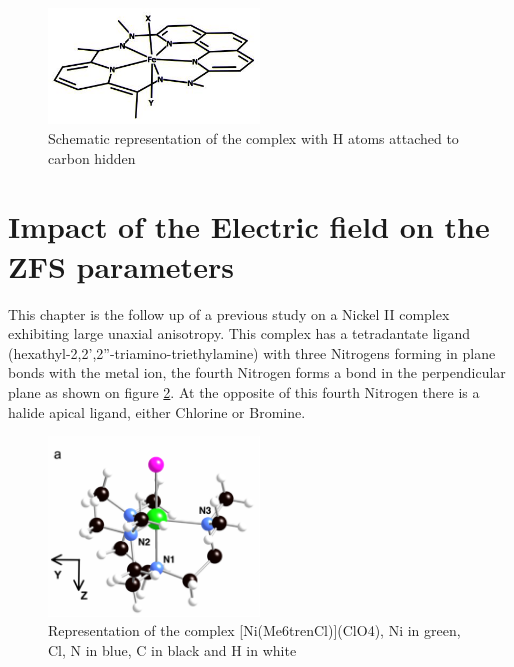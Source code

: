 \documentclass[10pt]{report}
\numberwithin{equation}{section}
\begin{document}
\begin{figure}[h!]
    \centering
    \includegraphics[width=0.5\textwidth]{Images/ComplexFe.XY.jpg}
    \caption{Schematic representation of the complex with H atoms attached to carbon hidden}
    \label{FeComplex}
\end{figure}



\section{Impact of the Electric field on the ZFS parameters}

This chapter is the follow up of a previous study on a Nickel II complex exhibiting large unaxial anisotropy.
This complex has a tetradantate ligand (hexathyl-2,2',2''-triamino-triethylamine) with three Nitrogens forming in plane bonds with the metal ion, the fourth Nitrogen forms a bond in the perpendicular plane as shown on figure \ref{NiMe6tren}.
At the opposite of this fourth Nitrogen there is a halide apical ligand, either Chlorine or Bromine.

\begin{figure}[h!]
    \centering
    \includegraphics[width=0.5\textwidth]{Images/NiMe6trenTalal.png}
    \caption{Representation of the complex [Ni(Me6trenCl)](ClO4), Ni in green, Cl, N in blue, C in black and H in white}
    \label{NiMe6tren}
\end{figure}
\end{document}
